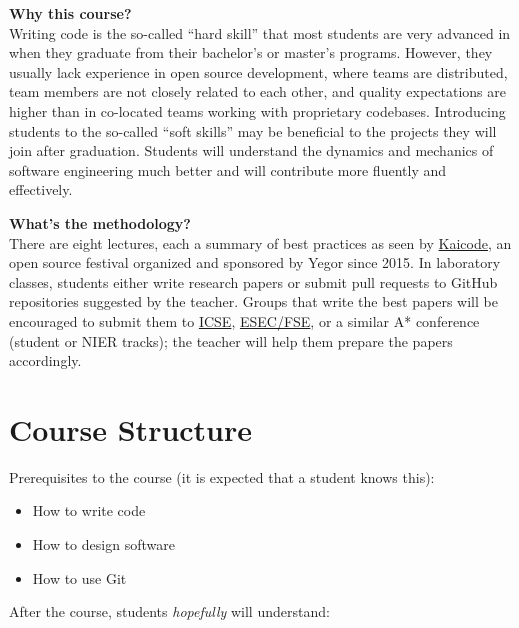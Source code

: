 \documentclass[nobrand,anonymous,nodate,nosecurity]{huawei}
\begin{document}
{\textbf{Why this course?}\\
Writing code is the so-called ``hard skill'' that most students are very advanced in when they graduate from their bachelor's or master's programs. However, they usually lack experience in open source development, where teams are distributed, team members are not closely related to each other, and quality expectations are higher than in co-located teams working with proprietary codebases. Introducing students to the so-called ``soft skills'' may be beneficial to the projects they will join after graduation. Students will understand the dynamics and mechanics of software engineering much better and will contribute more fluently and effectively.

\textbf{What's the methodology?}\\
There are eight lectures, each a summary of best practices as seen by \href{https://www.kaicode.org}{Kaicode}, an open source festival organized and sponsored by Yegor since 2015. In laboratory classes, students either write research papers or submit pull requests to GitHub repositories suggested by the teacher. Groups that write the best papers will be encouraged to submit them to \href{http://www.icse-conferences.org/}{ICSE}, \href{https://www.esec-fse.org/}{ESEC/FSE}, or a similar A* conference (student or NIER tracks); the teacher will help them prepare the papers accordingly.

\newpage
\section*{Course Structure}

Prerequisites to the course (it is expected that a student knows this):

\begin{itemize}
\item How to write code
\item How to design software
\item How to use Git
\end{itemize}

After the course, students \emph{hopefully} will understand:

}
\end{document}
